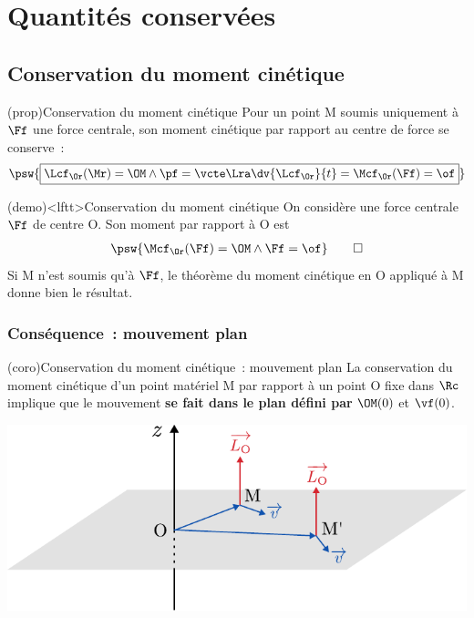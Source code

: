 \documentclass[../../main/main.tex]{subfiles}
\begin{document}
\section{Quantités conservées}
\subsection{Conservation du moment cinétique}
\vspace{-5pt}
\begin{tcb*}(prop){Conservation du moment cinétique}
	Pour un point M soumis uniquement à $\Ff$ une force centrale, son moment
	cinétique par rapport au centre de force se conserve~:
	\[
		\psw{
			\boxed{
				\Lcf_\Or(\Mr) = \OM\wedge\pf = \vcte
				\Lra
				\dv{\Lcf_\Or}{t} = \Mcf_\Or(\Ff) = \of
			}
		}
	\]
\end{tcb*}

\begin{tcb*}(demo)<lftt>{Conservation du moment cinétique}
	On considère une force centrale $\Ff$ de centre O. Son moment par rapport à O
	est
		\begin{gather*}
      \psw{\Mcf_\Or(\Ff) = \OM\wedge\Ff = \of}
      \qed
    \end{gather*}
	Si M n'est soumis qu'à $\Ff$, le théorème du moment cinétique en O appliqué à
	M donne bien le résultat.
\end{tcb*}

\subsubsection{Conséquence~: mouvement plan}

\begin{tcb*}[sidebyside](coro){Conservation du moment cinétique~: mouvement
  plan}
	La conservation du moment cinétique d'un point matériel M par rapport à un
	point O fixe dans $\Rc$ implique que le mouvement \textbf{se fait dans le
		plan défini par} $\OM(0)$ et $\vf(0)$.
    \tcblower
	\begin{center}
		\includegraphics[width=\linewidth]{mvt_plan}
	\end{center}
\end{tcb*}
\end{document}

